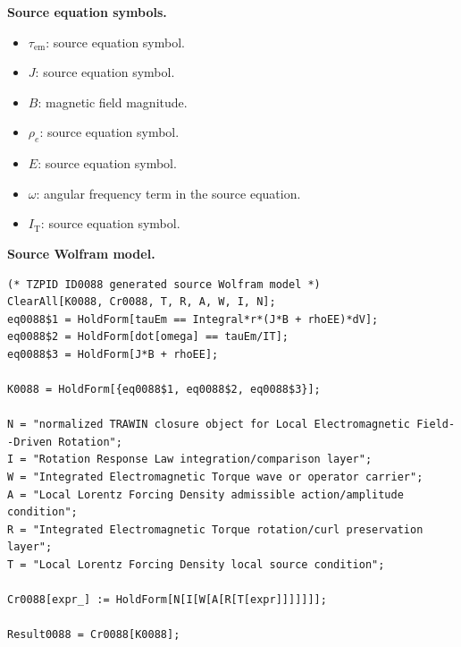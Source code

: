 \begin{minipage}[t]{0.49\linewidth}
\begingroup
\small
\raggedright
\textbf{Source equation symbols.}\par
\begin{itemize}[leftmargin=1.35em,itemsep=1pt,topsep=1pt,parsep=0pt]
    \item $\tau_{\mathrm{em}}$: source equation symbol.
    \item $J$: source equation symbol.
    \item $B$: magnetic field magnitude.
    \item $\rho_e$: source equation symbol.
    \item $E$: source equation symbol.
    \item $\omega$: angular frequency term in the source equation.
    \item $I_{\mathrm{T}}$: source equation symbol.
\end{itemize}
\endgroup
\end{minipage}\hfill
\begin{minipage}[t]{0.47\linewidth}
\begingroup
\scriptsize
\raggedright
\textbf{Source Wolfram model.}\par
\begin{Verbatim}[fontsize=\tiny,breaklines=true,breakanywhere=true]
(* TZPID ID0088 generated source Wolfram model *)
ClearAll[K0088, Cr0088, T, R, A, W, I, N];
eq0088$1 = HoldForm[tauEm == Integral*r*(J*B + rhoEE)*dV];
eq0088$2 = HoldForm[dot[omega] == tauEm/IT];
eq0088$3 = HoldForm[J*B + rhoEE];

K0088 = HoldForm[{eq0088$1, eq0088$2, eq0088$3}];

N = "normalized TRAWIN closure object for Local Electromagnetic Field--Driven Rotation";
I = "Rotation Response Law integration/comparison layer";
W = "Integrated Electromagnetic Torque wave or operator carrier";
A = "Local Lorentz Forcing Density admissible action/amplitude condition";
R = "Integrated Electromagnetic Torque rotation/curl preservation layer";
T = "Local Lorentz Forcing Density local source condition";

Cr0088[expr_] := HoldForm[N[I[W[A[R[T[expr]]]]]]];

Result0088 = Cr0088[K0088];
\end{Verbatim}
\endgroup
\end{minipage}

